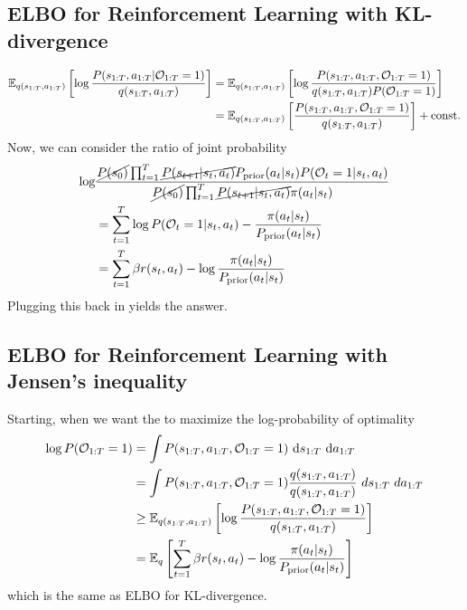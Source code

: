 \subsection{ELBO for Reinforcement Learning with KL-divergence}
\label{appx:chap2-ELBO-KL-Single}
\begin{equation*}
\begin{aligned}
    \mathbb{E}_{q(s_{1:T}, a_{1:T})}\left[ \log\frac{P(s_{1:T}, a_{1:T} | \mathcal{O}_{1:T} = 1)}{q(s_{1:T}, a_{1:T})} \right] &= \mathbb{E}_{q(s_{1:T}, a_{1:T})}\left[ \log\frac{P(s_{1:T}, a_{1:T} , \mathcal{O}_{1:T} = 1)}{q(s_{1:T}, a_{1:T}) P(\mathcal{O}_{1:T} = 1)} \right] \\
    &= \mathbb{E}_{q(s_{1:T}, a_{1:T})}\left[ \frac{P(s_{1:T}, a_{1:T} , \mathcal{O}_{1:T} = 1)}{q(s_{1:T}, a_{1:T})} \right] + \text{const.}
\end{aligned}
\end{equation*}
Now, we can consider the ratio of joint probability 
\begin{equation*}
\begin{aligned}
    \log &\frac{\cancel{P(s_0)} \prod^{T}_{t=1} \cancel{P(s_{t+1} | s_t, a_t)} P_{\text{prior}}(a_t | s_t) P(\mathcal{O}_t = 1 | s_t, a_t)}{\cancel{P(s_0)} \prod^{T}_{t=1} \cancel{P(s_{t+1} | s_t, a_t)} \pi(a_t | s_t) } \\
    &= \sum^T_{t=1} \log P(\mathcal{O}_t = 1 | s_t, a_t) - \frac{\pi(a_t | s_t)}{P_{\text{prior}}(a_t | s_t)} \\
    &= \sum^{T}_{t=1} \beta r(s_t, a_t) - \log \frac{\pi(a_t | s_t)}{P_{\text{prior}}(a_t | s_t)}
\end{aligned}
\end{equation*}
Plugging this back in yields the answer.

\subsection{ELBO for Reinforcement Learning with Jensen's inequality}
\label{appx:chap2-ELBO-Jensen-Single}
Starting, when we want the to maximize the log-probability of optimality 
\begin{equation*}
    \begin{aligned}
        \log P(\mathcal{O}_{1:T} = 1) &= \int P(s_{1:T}, a_{1:T}, \mathcal{O}_{1:T} = 1) \ \mathrm{d} s_{1:T} \ \mathrm{d} a_{1:T} \\ 
        &= \int P(s_{1:T}, a_{1:T}, \mathcal{O}_{1:T} = 1) \frac{q(s_{1:T}, a_{1:T})}{q(s_{1:T}, a_{1:T})} \ ds_{1:T} \ da_{1:T} \\
        &\ge \mathbb{E}_{q(s_{1:T}, a_{1:T})} \left[ \log \frac{P(s_{1:T}, a_{1:T}, \mathcal{O}_{1:T} = 1)}{q(s_{1:T}, a_{1:T})} \right] \\
        &=  \mathbb{E}_{q} \left[\sum^{T}_{t=1} \beta r(s_t, a_t) - \log \frac{\pi(a_t | s_t)}{P_{\text{prior}}(a_t | s_t)} \right]
    \end{aligned}
\end{equation*}
which is the same as ELBO for KL-divergence.


